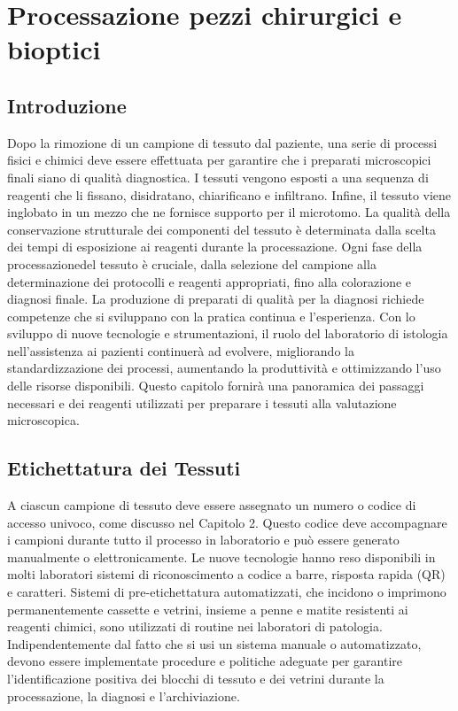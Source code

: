 \chapter{Processazione pezzi chirurgici e bioptici}

\section{Introduzione}
Dopo la rimozione di un campione di tessuto dal paziente, una serie di processi fisici e chimici deve essere effettuata per garantire che i preparati microscopici finali siano di qualità diagnostica. I tessuti vengono esposti a una sequenza di reagenti che li fissano, disidratano, chiarificano e infiltrano. Infine, il tessuto viene inglobato in un mezzo che ne fornisce supporto per il microtomo. La qualità della conservazione strutturale dei componenti del tessuto è determinata dalla scelta dei tempi di esposizione ai reagenti durante la processazione. Ogni fase della processazionedel tessuto è cruciale, dalla selezione del campione alla determinazione dei protocolli e reagenti appropriati, fino alla colorazione e diagnosi finale. La produzione di preparati di qualità per la diagnosi richiede competenze che si sviluppano con la pratica continua e l'esperienza. Con lo sviluppo di nuove tecnologie e strumentazioni, il ruolo del laboratorio di istologia nell'assistenza ai pazienti continuerà ad evolvere, migliorando la standardizzazione dei processi, aumentando la produttività e ottimizzando l'uso delle risorse disponibili. Questo capitolo fornirà una panoramica dei passaggi necessari e dei reagenti utilizzati per preparare i tessuti alla valutazione microscopica.

\section{Etichettatura dei Tessuti}
A ciascun campione di tessuto deve essere assegnato un numero o codice di accesso univoco, come discusso nel Capitolo 2. Questo codice deve accompagnare i campioni durante tutto il processo in laboratorio e può essere generato manualmente o elettronicamente. Le nuove tecnologie hanno reso disponibili in molti laboratori sistemi di riconoscimento a codice a barre, risposta rapida (QR) e caratteri. Sistemi di pre-etichettatura automatizzati, che incidono o imprimono permanentemente cassette e vetrini, insieme a penne e matite resistenti ai reagenti chimici, sono utilizzati di routine nei laboratori di patologia. Indipendentemente dal fatto che si usi un sistema manuale o automatizzato, devono essere implementate procedure e politiche adeguate per garantire l'identificazione positiva dei blocchi di tessuto e dei vetrini durante la processazione, la diagnosi e l'archiviazione.

